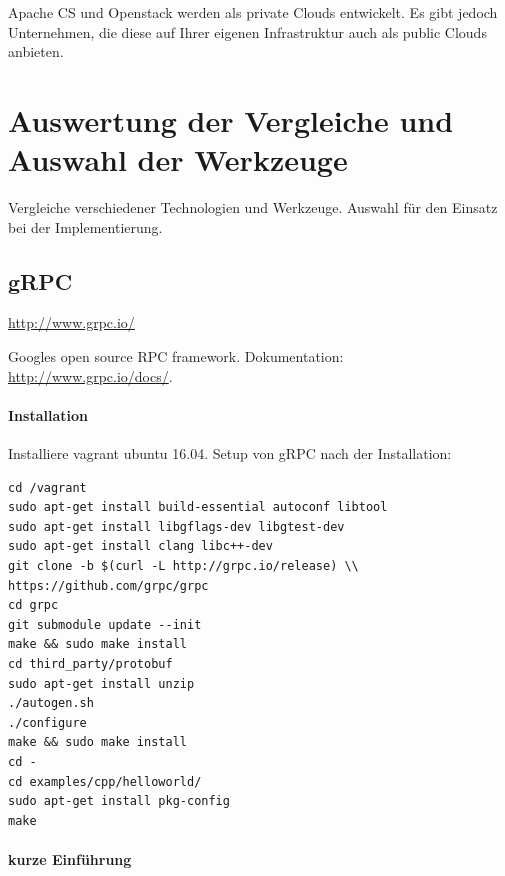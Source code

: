 \documentclass[a4paper,10pt]{article}
\numberwithin{figure}{section}
\numberwithin{table}{section}
\begin{document}
Apache CS und Openstack werden als private Clouds entwickelt.
Es gibt jedoch Unternehmen, die diese auf Ihrer eigenen Infrastruktur auch als public Clouds anbieten.


\newpage













\section{Auswertung der Vergleiche und Auswahl der Werkzeuge}

Vergleiche verschiedener Technologien und Werkzeuge.
Auswahl für den Einsatz bei der Implementierung.

\subsection{gRPC} \url{http://www.grpc.io/}

Googles open source RPC framework.
Dokumentation: \url{http://www.grpc.io/docs/}.

\paragraph{Installation}

Installiere vagrant ubuntu 16.04.
Setup von gRPC nach der Installation:

\begin{lstlisting}[frame=single,caption=Installiere vagrant ubuntu 16.04, breaklines=true]
cd /vagrant
sudo apt-get install build-essential autoconf libtool
sudo apt-get install libgflags-dev libgtest-dev
sudo apt-get install clang libc++-dev
git clone -b $(curl -L http://grpc.io/release) \\
https://github.com/grpc/grpc
cd grpc
git submodule update --init
make && sudo make install
cd third_party/protobuf
sudo apt-get install unzip
./autogen.sh
./configure
make && sudo make install
cd -
cd examples/cpp/helloworld/
sudo apt-get install pkg-config
make
\end{lstlisting}

\paragraph{kurze Einführung}
\end{document}
